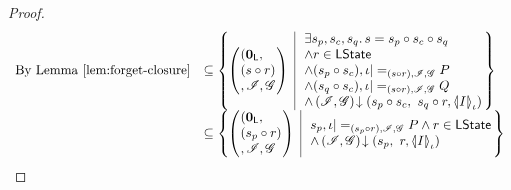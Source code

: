 \begin{proof}
\[\begin{array}{r l}
	
	
	\text{By \lem~\ref{lem:forget-closure}} & 
	\subseteq \left\{
	\hspace*{-0.2cm}
	\begin{array}{l | l}
		\left(
		\hspace*{-0.15cm}
		\begin{array}{l}
		(\unitL, \\
		(s \composeL r)\\
		, \lmod{}, \gmod
		\end{array}
		\hspace*{-0.15cm}
		\right)
		&
		\hspace*{-0.1cm}
		\begin{array}{l}
			\exsts{s_p, s_c, s_q} s = s_p \composeL s_c \composeL s_q \\
			\land r \in \LStates \\
			\land (s_p \composeL s_c), \lenv |=_{(s \composeL r), \lmod, \gmod} P \\
			\land (s_q \composeL s_c), \lenv |=_{(s \composeL r), \lmod, \gmod} Q \\			
			\land \extendsAM{\lmod{}, \gmod}{s_p \composeL s_c}{\ s_q \composeL r}{\semI[\lenv]{I}}
		\end{array}
		\hspace*{-0.1cm}
	\end{array}
	\hspace*{-0.2cm}
	\right\} \\
	
	
	
	
	
	
	& \subseteq
	\left\{
	\hspace*{-0.2cm}
	\begin{array}{l | l}
		\left(
		\hspace*{-0.15cm}
		\begin{array}{l}
		(\unitL, \\
		(s_p \composeL r)\\
		, \lmod{}, \gmod
		\end{array}
		\hspace*{-0.15cm}
		\right)
		&
		\hspace*{-0.1cm}
		\begin{array}{l}

			s_p, \lenv |=_{(s_p \composeL r), \lmod, \gmod} P 
			\land r \in \LStates \\
			\land \extendsAM{\lmod{}, \gmod}{s_p}{\ r}{\semI[\lenv]{I}}
		\end{array}
		\hspace*{-0.1cm}
	\end{array}
	\hspace*{-0.2cm}
	\right\} \\
	

\end{array}\]
\end{proof}
